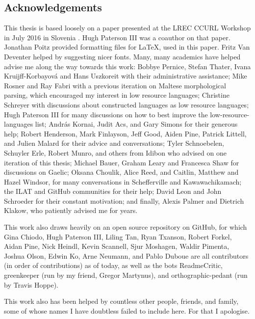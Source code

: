 \newpage
\noindent\subsection*{Acknowledgements}

This thesis is based loosely on a paper presented at the LREC CCURL Workshop in July 2016 in Slovenia \citep{CCURL}. Hugh Paterson III was a coauthor on that paper. Jonathan Poitz provided formatting files for \LaTeX, used in this paper. Fritz Van Deventer helped by suggesting nicer fonts. Many, many academics have helped advise me along the way towards this work: Bobbye Pernice, Stefan Thater, Ivana Kruijff-Korbayov\'a and Hans Uszkoreit with their administrative assistance; Mike Rosner and Ray Fabri with a previous iteration on Maltese morphological parsing, which encouraged my interest in low resource languages; Christine Schreyer with discussions about constructed languages as low resource languages; Hugh Paterson III for many discussions on how to best improve the low-resource-languages list; Andr\'{a}s Kornai, Judit Acs, and Gary Simons for their generous help; Robert Henderson, Mark Finlayson, Jeff Good, Aiden Pine, Patrick Littell, and Julien Malard for their advice and conversations; Tyler Schnoebelen, Schuyler Erle, Robert Munro, and others from Idibon who advised on one iteration of this thesis; Michael Bauer, Graham Leary and Francesca Shaw for discussions on Gaelic; Oksana Choulik, Alice Reed, and Caitlin, Matthew and Hazel Windsor, for many conversations in Schefferville and Kawawachikamach; the ILAT and GitHub communities for their help; David Leon and John Schroeder for their constant motivation; and finally, Alexis Palmer and Dietrich Klakow, who patiently advised me for years.

This work also draws heavily on an open source repository on GitHub, for which Gina Chiodo, Hugh Paterson III, Liling Tan, Ryan Txanson, Robert Forkel, Aidan Pine, Nick Heindl, Kevin Scannell, Sjur Moshagen, Waldir Pimenta, Joshua Olson, Edwin Ko, Arne Neumann, and Pablo Duboue are all contributors (in order of contributions) as of today, as well as the bots ReadmeCritic, greenkeeper (run by my friend, Gregor Martynus), and orthographic-pedant (run by Travis Hoppe).

This work also has been helped by countless other people, friends, and family, some of whose names I have doubtless failed to include here. For that I apologise. 

